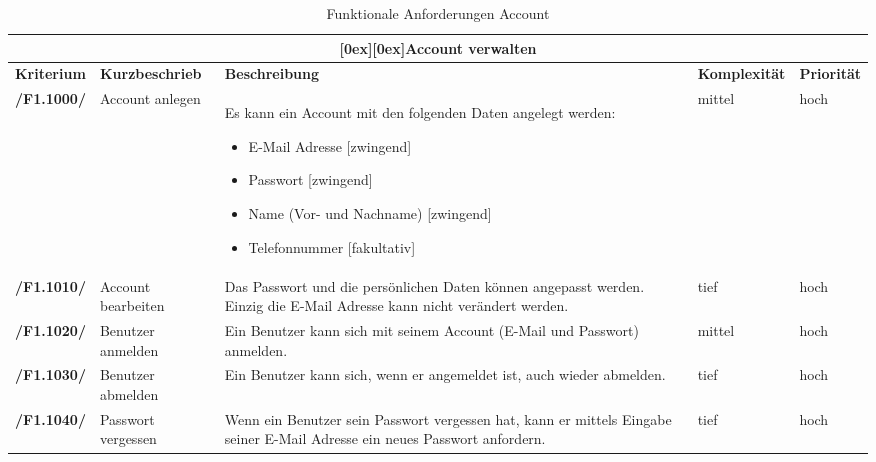 \documentclass[10pt,a4paper,titlepage,twoside,german,final]{zhawreprt}
\newcommand{\AddRequirement}[2]{
\textbf{/#1#2/}
}
\newcommand{\F}[1]{
\AddRequirement{F1.}{#1}
}
\newcommand{\tableheader}[2]{\multicolumn{#1}{c}{\raisebox{-0.3em}[0ex][0ex]{\large{\textbf{#2}}}}}
\numberwithin{table}{chapter}
\begin{document}
\begin{table}[ht]\centering
\begin{longtable}{l|p{2.5cm}|p{5cm}|p{2cm}|p{1.5cm}}\hline
\tableheader{5}{Account verwalten}\\[0.3em]\hline
\textbf{Kriterium} & \textbf{Kurzbeschrieb} & \textbf{Beschreibung} & \textbf{Komplexität} & \textbf{Priorität}\\\hline
\F{1000} & Account anlegen & Es kann ein Account mit den folgenden Daten angelegt werden:\linebreak
\begin{itemize}
\item E-Mail Adresse [zwingend]
\item Passwort [zwingend]
\item Name (Vor- und Nachname) [zwingend]
\item Telefonnummer [fakultativ]
\end{itemize}
& mittel & hoch\\\hline
\F{1010} & Account bearbeiten & Das Passwort und die persönlichen Daten können angepasst werden. Einzig die E-Mail Adresse kann nicht verändert werden. & tief & hoch\\\hline
\F{1020} & Benutzer anmelden & Ein Benutzer kann sich mit seinem Account (E-Mail und Passwort) anmelden. & mittel & hoch\\\hline
\F{1030} & Benutzer abmelden & Ein Benutzer kann sich, wenn er angemeldet ist, auch wieder abmelden. & tief & hoch\\\hline
\F{1040} & Passwort vergessen & Wenn ein Benutzer sein Passwort vergessen hat, kann er mittels Eingabe seiner E-Mail Adresse ein neues Passwort anfordern. & tief & hoch\\\hline
\end{longtable}
\caption{Funktionale Anforderungen Account}\label{tbl:FuncAccount}
\end{table}
\end{document}
